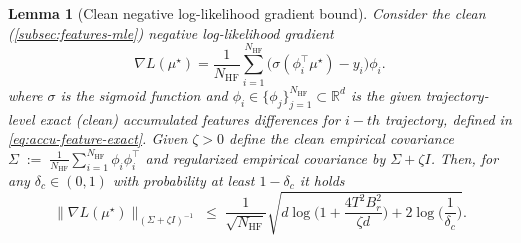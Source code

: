 \documentclass[10pt]{article} %
\theoremstyle{plain}
\newtheorem{lemma}[theorem]{Lemma}
\theoremstyle{definition}
\theoremstyle{remark}
\newcommand{\bR}{\mathbb{R}}
\begin{document}





\newpage
 

\begin{lemma}[Clean negative log-likelihood gradient bound]\label{lem:clean-like-grad-bound}
Consider the \emph{clean} (\ref{subsec:features-mle}) negative log-likelihood gradient
\[
\nabla L(\mu^\star)= \frac{1}{N_{\mathrm{HF}}}\sum_{i=1}^{N_{\mathrm{HF}}}\bigl(\sigma(\phi_i^\top\mu^\star)-y_i\bigr)\phi_i.
\]
where $\sigma$ is the sigmoid function and $\phi_i\in\{\phi_j\}_{j=1}^{N_{\mathrm{HF}}}\subset\bR^d$ is the given trajectory-level exact (clean) accumulated features differences for $i-th$ trajectory, defined in \ref{eq:accu-feature-exact}. Given $\zeta >0$ define the clean empirical covariance
\(
\Sigma \;:=\;\frac{1}{N_{\mathrm{HF}}}\sum_{i=1}^{N_{\mathrm{HF}}}\phi_i\phi_i^\top
\)
and regularized empirical covariance by $\Sigma+\zeta I$. Then, for any $\delta_c\in(0,1)$ with probability at least $1-\delta_c$ it holds
\begin{equation}\label{eq:score_bound_tildeSigma}
\bigl\|\nabla L(\mu^\star)\bigr\|_{(\Sigma+\zeta I)^{-1}}\;\le\;\frac{1}{\sqrt{N_{\mathrm{HF}}}}
\sqrt{d\log \Big(1+\frac{4T^2 B_r^2}{\zeta d}\Big)+2\log \Big(\frac{1}{\delta_c}\Big)}.
\end{equation}
\end{lemma}
\end{document}

